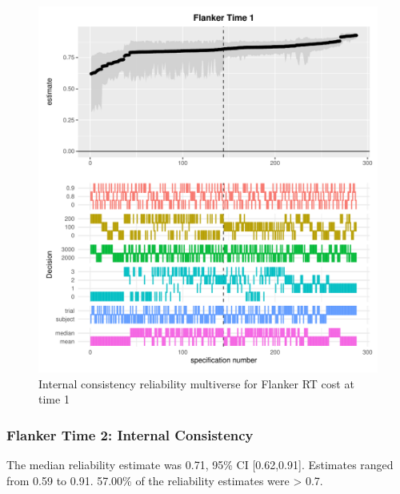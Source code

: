 \documentclass[
  english,
  man,floatsintext]{apa6}
\begin{document}
\begin{figure}
\centering
\includegraphics{Reliability_Multiverse_files/figure-latex/unnamed-chunk-8-1.pdf}
\caption{\label{fig:unnamed-chunk-8}Internal consistency reliability multiverse for Flanker RT cost at time 1}
\end{figure}

\newpage

\hypertarget{flanker-time-2-internal-consistency}{%
\subsubsection{Flanker Time 2: Internal Consistency}\label{flanker-time-2-internal-consistency}}

The median reliability estimate was 0.71, 95\% CI {[}0.62,0.91{]}. Estimates ranged from 0.59 to 0.91. 57.00\% of the reliability estimates were \textgreater{} 0.7.
\end{document}
